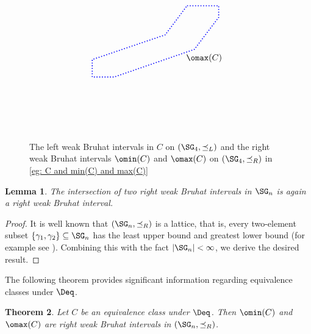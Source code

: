 \documentclass[12pt, reqno]{amsart}
\newtheorem{theorem}{Theorem}[section]
\newtheorem{lemma}[theorem]{Lemma}
\theoremstyle{definition}
\numberwithin{equation}{section} \numberwithin{figure}{section}
\numberwithin{table}{section}
\begin{document}
\begin{figure}[t]
\[{\begin{tikzpicture}[baseline = 0mm, scale = 0.8]
\draw [dotted, blue, line width=0.4mm]
(-0.35*\wtab,4.2*\htab)
-- (0.3*\wtab,4.2*\htab)
-- (0.3*\wtab,3.8*\htab)
-- (-0.2*\wtab,2.7*\htab)
-- (-1.85*\wtab,1.75*\htab)
-- (-2.3*\wtab,1.75*\htab)
-- (-2.3*\wtab,2.35*\htab)
-- (-0.8*\wtab,3.2*\htab)
-- (-0.35*\wtab,4.2*\htab);
\node at (0*\wtab, 2.4*\htab) {$\omax(C)$};
\end{tikzpicture}
}
\]
\caption{The left weak Bruhat intervals in $C$ on $(\SG_4, \preceq_L)$ and the right weak Bruhat intervals $\omin(C)$ and $\omax(C)$ on $(\SG_4, \preceq_R)$ in \cref{eg: C and min(C) and max(C)}}
\label{fig: C and min(C) and max(C)}
\end{figure}




\begin{lemma}\label{lem: intersection of int is int}
The intersection of two right weak Bruhat intervals in $\SG_n$ is again a right weak Bruhat interval.
\end{lemma}

\begin{proof}
It is well known that $(\SG_n, \preceq_R)$ is a lattice,  that is, every two-element subset $\{\gamma_1,\gamma_2\} \subseteq \SG_n$ has the least upper bound and greatest lower bound (for example see \cite[Section 3.2]{05BB}).
Combining this with the fact $|\SG_n| < \infty$, we derive the desired result.
\end{proof}


The following theorem provides significant information regarding equivalence classes under $\Deq$.






\begin{theorem}\label{thm: desc pres equiv}
Let $C$ be an equivalence class 
under $\Deq$.
Then $\omin(C)$ and $\omax(C)$ are right weak Bruhat intervals in $(\SG_n, \preceq_R)$.
\end{theorem}
\end{document}
